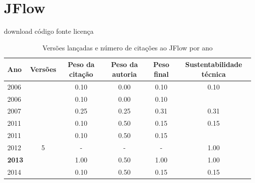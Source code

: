 \section{JFlow}
\checkmark download
\checkmark código fonte
\checkmark licença


\begin{table}[H]
\caption{Versões lançadas e número de citações ao JFlow por ano}
\centering
\begin{tabular}{| l | c | c | c | c | c |}
  \hline
  Ano & Versões & Peso da citação & Peso da autoria & Peso final & Sustentabilidade técnica \\
  \hline
            2006
          &
          
          &
          0.10
          &
          0.00
          &
          0.10
          &
            {\color{red} 0.10}
          \\
            2006
          &
          
          &
          0.10
          &
          0.00
          &
          0.10
          &
          \\
\hline
            2007
          &
          
          &
          0.25
          &
          0.25
          &
          0.31
          &
            {\color{red} 0.31}
          \\
\hline
            2011
          &
          
          &
          0.10
          &
          0.50
          &
          0.15
          &
            {\color{red} 0.15}
          \\
            2011
          &
          
          &
          0.10
          &
          0.50
          &
          0.15
          &
          \\
\hline
        2012 & 5 & - & - & -
        &
          {\color{blue} 1.00}
        \\
\hline
            {\bf 2013}
          &
          
          &
          1.00
          &
          0.50
          &
          1.00
          &
            {\color{blue} 1.00}
          \\
\hline
            2014
          &
          
          &
          0.10
          &
          0.50
          &
          0.15
          &
            {\color{red} 0.15}
          \\
\hline
\end{tabular}
\end{table}

